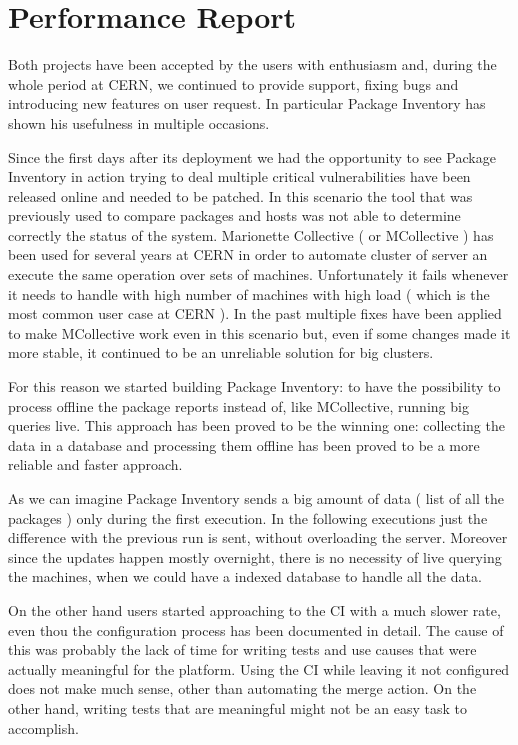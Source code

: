 \section{Performance Report}

Both projects have been accepted by the users with enthusiasm and, during
the whole period at CERN, we continued to provide support, fixing bugs and
introducing new features on user request. In particular Package Inventory
has shown his usefulness in multiple occasions.

Since the first days after its deployment we had the opportunity to see
Package Inventory in action trying to deal multiple critical
vulnerabilities have been released online and needed to be patched. In
this scenario the tool that was previously used to compare packages and
hosts was not able to determine correctly the status of the system.
Marionette Collective ( or MCollective ) has been used for several years
at CERN in order to automate cluster of server an execute the same
operation over sets of machines. Unfortunately it fails whenever it needs
to handle with high number of machines with high load ( which is the most
common user case at CERN ). In the past multiple fixes have been applied
to make MCollective work even in this scenario but, even if some changes
made it more stable, it continued to be an unreliable solution for big
clusters.

For this reason we started building Package Inventory: to have the
possibility to process offline the package reports instead of, like
MCollective, running big queries live. This approach has been proved to be
the winning one: collecting the data in a database and processing them
offline has been proved to be a more reliable and faster approach.

As we can imagine Package Inventory sends a big amount of data ( list of
all the packages ) only during the first execution. In the following
executions just the difference with the previous run is sent, without
overloading the server. Moreover since the updates happen mostly
overnight, there is no necessity of live querying the machines, when we
could have a indexed database to handle all the data.

On the other hand users started approaching to the CI with a much slower
rate, even thou the configuration process has been documented in detail.
The cause of this was probably the lack of time for writing tests and use
causes that were actually meaningful for the platform. Using the CI while
leaving it not configured does not make much sense, other than automating
the merge action. On the other hand, writing tests that are meaningful
might not be an easy task to accomplish. 
